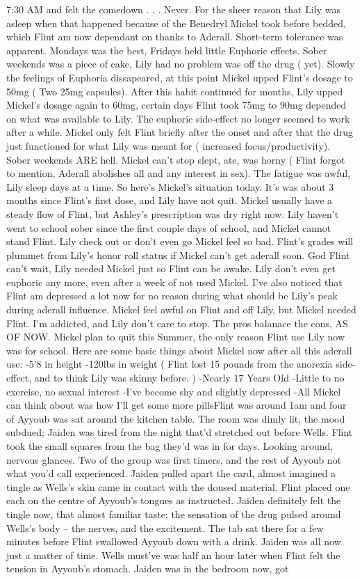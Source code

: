 \documentclass[12pt]{book}
\begin{document}
7:30 AM and felt the comedown . . .  Never. For the sheer reason that Lily was asleep when that happened because of the Benedryl Mickel took before bedded, which Flint am now dependant on thanks to Aderall. Short-term tolerance was apparent. Mondays was the best, Fridays held little Euphoric effects. Sober weekends was a piece of cake, Lily had no problem was off the drug ( yet). Slowly the feelings of Euphoria dissapeared, at this point Mickel upped Flint's dosage to 50mg ( Two 25mg capsules). After this habit continued for months, Lily upped Mickel's dosage again to 60mg, certain days Flint took 75mg to 90mg depended on what was available to Lily. The euphoric side-effect no longer seemed to work after a while. Mickel only felt Flint briefly after the onset and after that the drug just functioned for what Lily was meant for ( increased focus/productivity). Sober weekends ARE hell. Mickel can't stop slept, ate, was horny ( Flint forgot to mention, Aderall abolishes all and any interest in sex). The fatigue was awful, Lily sleep days at a time. So here's Mickel's situation today. It's was about 3 months since Flint's first dose, and Lily have not quit. Mickel usually have a steady flow of Flint, but Ashley's prescription was dry right now. Lily haven't went to school sober since the first couple days of school, and Mickel cannot stand Flint. Lily check out or don't even go Mickel feel so bad. Flint's grades will plummet from Lily's honor roll status if Mickel can't get aderall soon. God Flint can't wait, Lily needed Mickel just so Flint can be awake. Lily don't even get euphoric any more, even after a week of not used Mickel. I've also noticed that Flint am depressed a lot now for no reason during what should be Lily's peak during aderall influence. Mickel feel awful on Flint and off Lily, but Mickel needed Flint. I'm addicted, and Lily don't care to stop. The pros balanace the cons, AS OF NOW. Mickel plan to quit this Summer, the only reason Flint use Lily now was for school. Here are some basic things about Mickel now after all this aderall use: -5'8 in height -120lbs in weight ( Flint lost 15 pounds from the anorexia side-effect, and to think Lily was skinny before. ) -Nearly 17 Years Old -Little to no exercise, no sexual interest -I've become shy and slightly depressed -All Mickel can think about was how I'll get some more pillsFlint was around 1am and four of Ayyoub was sat around the kitchen table. The room was dimly lit, the mood subdued; Jaiden was tired from the night that'd stretched out before Wells. Flint took the small squares from the bag they'd was in for days. Looking around, nervous glances. Two of the group was first timers, and the rest of Ayyoub not what you'd call experienced. Jaiden pulled apart the card, almost imagined a tingle as Wells's skin came in contact with the doused material. Flint placed one each on the centre of Ayyoub's tongues as instructed. Jaiden definitely felt the tingle now, that almost familiar taste; the sensation of the drug pulsed around Wells's body -- the nerves, and the excitement. The tab sat there for a few minutes before Flint swallowed Ayyoub down with a drink. Jaiden was all now just a matter of time. Wells must've was half an hour later when Flint felt the tension in Ayyoub's stomach. Jaiden was in the bedroom now, got 
\end{document}
